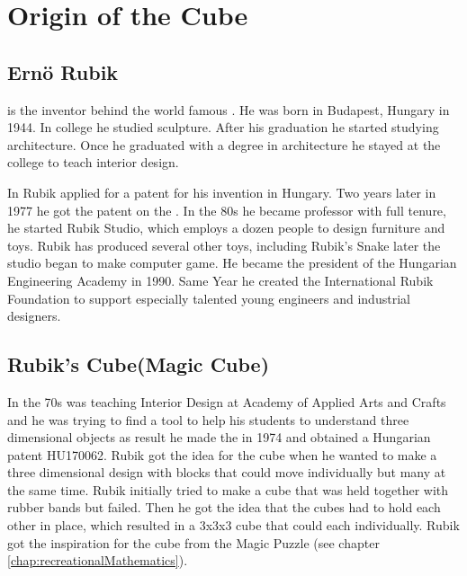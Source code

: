 \chapter{Origin of the Cube}
\section{Ern\"{o} Rubik}
\erno{} is the inventor behind the world famous \rubik{}. He was born in Budapest, Hungary in 1944.  In college he studied sculpture. After his graduation he started studying architecture.  Once he graduated with a degree in architecture he stayed at the college to teach interior design. 

In  Rubik applied for a patent for his invention in Hungary. Two years later in 1977 he got the patent on the \mcube{}.
In the 80s he became professor with full tenure, he started Rubik Studio, which employs a dozen people to design furniture and toys. Rubik has produced several other toys, including Rubik's Snake later the studio began to make computer game. He became the president of the Hungarian Engineering Academy in 1990. Same Year he created the International Rubik Foundation to support especially talented young engineers and industrial designers.
 
\section{Rubik's Cube(Magic Cube)}
In the 70s \erno{} was teaching Interior Design at Academy of Applied Arts and Crafts and he was trying to find a tool to help his students to understand three dimensional objects as result he made the \mcube in 1974 and obtained a Hungarian patent HU170062. 
Rubik got the idea for the cube when he wanted to make a three dimensional design with blocks that could move individually but many at the same time. Rubik initially tried  to make a cube that was held together with rubber bands but failed. Then he got the idea that the cubes had to hold each other in place, which resulted in a 3x3x3 cube that could \twist{} each \face{} individually. Rubik got the inspiration for the cube from the Magic Puzzle (see chapter \ref{chap:recreationalMathematics}).

